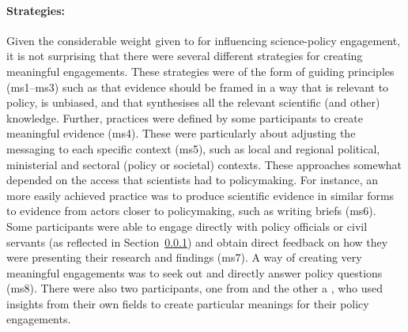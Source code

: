 \paragraph{Strategies:}

Given the considerable weight given to \ismsm for influencing science-policy engagement, it is not surprising that there were several different strategies for creating meaningful engagements. These strategies were of the form of guiding principles (ms1--ms3) such as that evidence should be framed in a way that is relevant to policy, is unbiased, and that synthesises all the relevant scientific (and other) knowledge. Further, practices were defined by some participants to create meaningful evidence (ms4). These were particularly about adjusting the messaging to each specific context (ms5), such as local and regional political, ministerial and sectoral (policy or societal) contexts. These approaches somewhat depended on the access that scientists had to policymaking. For instance, an more easily achieved practice was to produce scientific evidence in similar forms to evidence from actors closer to policymaking, such as writing briefs (ms6). Some participants were able to engage directly with policy officials or civil servants (as reflected in Section~\ref{sec:resnetwork}) and obtain direct feedback on how they were presenting their research and findings (ms7). A way of creating very meaningful engagements was to seek out and directly answer policy questions (ms8). There were also two participants, one from  and the other a , who used insights from their own fields to create particular meanings for their policy engagements. 

\subsubsection{\ismsnr}\label{sec:resnetwork}

